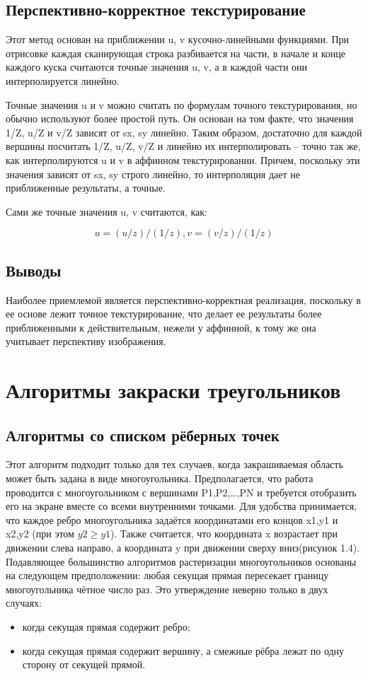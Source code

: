 \documentclass[12pt,a4paper,oneside]{report}
\begin{document}
 	\subsection{Перспективно-корректное текстурирование}
 	\quad Этот метод основан на приближении u, v кусочно-линейными функциями. При отрисовке каждая сканирующая строка разбивается на части, в начале и конце каждого куска считаются точные значения u, v, а в каждой части они интерполируется линейно.
 	
 	 Точные значения u и v можно считать по формулам точного текстурирования, но обычно используют более простой путь. Он основан на том факте, что значения 1/Z, u/Z и v/Z зависят от sx, sy линейно. Таким образом, достаточно для каждой вершины посчитать 1/Z, u/Z, v/Z и линейно их интерполировать -- точно так же, как интерполируются u и v в аффинном текстурировании. Причем, поскольку эти значения зависят от sx, sy строго линейно, то интерполяция дает не приближенные результаты, а точные.
 	
 	Сами же точные значения u, v считаются, как:
 	
 	\begin{equation}
 	u = (u / z) / (1 / z),
 	v = (v / z) / (1 / z)
 	\end{equation}
 	
 	\subsection{Выводы}
 	 \quad Наиболее приемлемой является перспективно-корректная реализация, поскольку в ее основе лежит точное текстурирование, что делает ее результаты более приближенными к действительным, нежели у аффинной, к тому же она учитывает перспективу изображения. 
 	
 	\section {Алгоритмы закраски треугольников}
 	\subsection{Алгоритмы со списком рёберных точек}
 	 \quad Этот алгоритм подходит только для тех случаев, когда закрашиваемая область может быть задана в виде многоугольника. Предполагается, что  работа проводится с многоугольником с вершинами P1,P2,…,PN и требуется отобразить его на экране вместе со всеми внутренними точками. Для удобства принимается, что каждое ребро многоугольника задаётся координатами его концов x1,y1 и x2,y2 (при этом $y2 \geqslant y1$). Также считается, что координата x возрастает при движении слева направо, а координата y при движении сверху вниз(рисунок 1.4).
 	Подавляющее большинство алгоритмов растеризации многоугольников основаны на следующем предположении: любая секущая прямая пересекает границу многоугольника чётное число раз. Это утверждение неверно только в двух случаях:
 	\begin{itemize}
 		\item когда секущая прямая содержит ребро;
 		\item когда секущая прямая содержит вершину, а смежные рёбра лежат по одну сторону от секущей прямой.
 	\end{itemize}
 	
\end{document}
